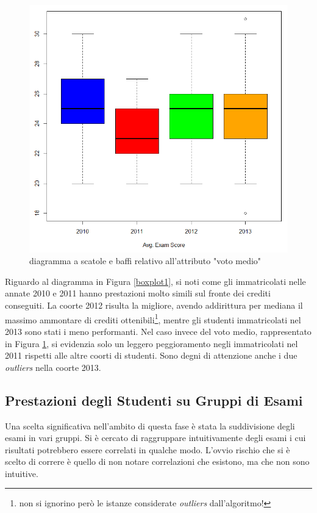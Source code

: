             \begin{figure}
                \centering
                \caption{diagramma a scatole e baffi relativo all'attributo "voto medio"}
                \label{boxplot2}
            	\includegraphics[scale=0.70]{img/box_plot_2.png}
            \end{figure}

            Riguardo al diagramma in Figura \ref{boxplot1}, si noti come gli immatricolati nelle annate 2010 e 2011 hanno prestazioni molto simili sul fronte dei crediti conseguiti. La coorte 2012 risulta la migliore, avendo addirittura per mediana il massimo ammontare di crediti ottenibili\footnote{non si ignorino però le istanze considerate \textit{outliers} dall’algoritmo!}, mentre gli studenti immatricolati nel 2013 sono stati i meno performanti. Nel caso invece del voto medio, rappresentato in Figura \ref{boxplot2}, si evidenzia solo un leggero peggioramento negli immatricolati nel 2011 rispetti alle altre coorti di studenti. Sono degni di attenzione anche i due \textit{outliers} nella coorte 2013.

        \subsection{Prestazioni degli Studenti su Gruppi di Esami}

            Una scelta significativa nell’ambito di questa fase è stata la suddivisione degli esami in vari gruppi. Si è cercato di raggruppare intuitivamente degli esami i cui risultati potrebbero essere correlati in qualche modo. L’ovvio rischio che si è scelto di correre è quello di non notare correlazioni che esistono, ma che non sono intuitive. \\

